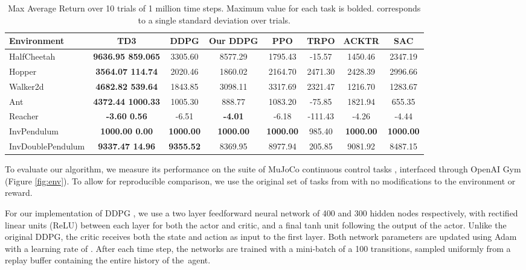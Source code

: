 \documentclass{article}
\begin{document}
\begin{table*}[t]
\centering
\caption{Max Average Return over 10 trials of 1 million time steps. Maximum value for each task is bolded.  corresponds to a single standard deviation over trials. }
\label{results}
\begin{center}
\begin{small}
\begin{tabular}{lccccccc}
\toprule
\bf{Environment} & \bf{TD3} & \bf{DDPG} & \bf{Our DDPG} & \bf{PPO} & \bf{TRPO} & \bf{ACKTR} & \bf{SAC} \\
\midrule
HalfCheetah 	& \bf{9636.95  859.065}& 3305.60 		& 8577.29 	& 1795.43 		& -15.57  & 1450.46 & 2347.19 \\  
Hopper 			& \bf{3564.07  114.74} & 2020.46 		& 1860.02		& 2164.70		& 2471.30 & 2428.39 & 2996.66 \\
Walker2d 		& \bf{4682.82  539.64} & 1843.85		& 3098.11 		& 3317.69		& 2321.47 & 1216.70 & 1283.67 \\
Ant 			& \bf{4372.44  1000.33} & 1005.30 		& 888.77 		& 1083.20		& -75.85  & 1821.94 & 655.35 \\
Reacher 		& \bf{-3.60  0.56}		& -6.51 	   	& \bf{-4.01} 	& -6.18			& -111.43 & -4.26 & -4.44\\
InvPendulum 	& \bf{1000.00  0.00} 		& \bf{1000.00} 	& \bf{1000.00}  & \bf{1000.00}	& 985.40  & \bf{1000.00} & \bf{1000.00} \\
InvDoublePendulum 	& \bf{9337.47  14.96} 	& \bf{9355.52} 	& 8369.95 		& 8977.94		& 205.85  & 9081.92 & 8487.15 \\
\bottomrule
\end{tabular}
\end{small}
\end{center}
\vskip -0.1in
\end{table*}

To evaluate our algorithm, we measure its performance on the suite of MuJoCo continuous control tasks \cite{mujoco}, interfaced through OpenAI Gym \cite{OpenAIGym} (Figure \ref{fig:env}). To allow for reproducible comparison, we use the original set of tasks from \citet{OpenAIGym} with no modifications to the environment or reward. 

For our implementation of DDPG \cite{DDPG}, we use a two layer feedforward neural network of 400 and 300 hidden nodes respectively, with rectified linear units (ReLU) between each layer for both the actor and critic, and a final tanh unit following the output of the actor. Unlike the original DDPG, the critic receives both the state and action as input to the first layer. Both network parameters are updated using Adam \cite{adam} with a learning rate of . After each time step, the networks are trained with a mini-batch of a 100 transitions, sampled uniformly from a replay buffer containing the entire history of the~agent. 
\end{document}
